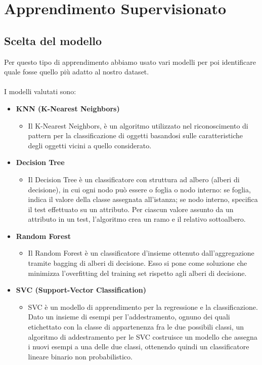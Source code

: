 \documentclass{article}
\begin{document}
\section{Apprendimento Supervisionato}
\subsection{Scelta del modello}
Per questo tipo di apprendimento abbiamo usato vari modelli per poi identificare quale fosse quello più adatto al nostro dataset. 
\\\\
I modelli valutati sono:
\begin{itemize}
    \item \textbf{KNN (K-Nearest Neighbors)}
    \begin{itemize} \item Il K-Nearest Neighbors, è un algoritmo utilizzato nel riconoscimento di pattern per la classificazione di oggetti basandosi sulle caratteristiche degli oggetti vicini a quello considerato.
    \end{itemize}
    \item \textbf{Decision Tree}
    \begin{itemize} \item Il Decision Tree è un classificatore con struttura ad albero (alberi di decisione), in cui ogni nodo può essere o foglia o nodo interno: se foglia, indica il valore della classe assegnata all’istanza; se nodo interno, specifica il test effettuato su un attributo. Per ciascun valore assunto da un attributo in un test, l’algoritmo crea un ramo e il relativo sottoalbero.
    \end{itemize}
    \item \textbf{Random Forest} 
    \begin{itemize} \item Il Random Forest è un classificatore d'insieme ottenuto dall'aggregazione tramite bagging di alberi di decisione. Esso si pone come soluzione che minimizza l'overfitting del training set rispetto agli alberi di decisione.
    \end{itemize}
    \item \textbf{SVC (Support-Vector Classification)}
    \begin{itemize} \item SVC è un modello di apprendimento per la regressione e la classificazione. Dato un insieme di esempi per l'addestramento, ognuno dei quali etichettato con la classe di appartenenza fra le due possibili classi, un algoritmo di addestramento per le SVC costruisce un modello che assegna i nuovi esempi a una delle due classi, ottenendo quindi un classificatore lineare binario non probabilistico.
    \end{itemize}
    \end{itemize}
\end{document}
